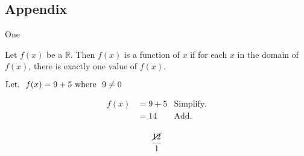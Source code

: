 \begin{appendix}
    \chapter{Appendix}
        One
        
    Let $f(x)$ be a $\mathbb{R}$. Then $f(x)$ is a function of $x$ if for each $x$ in the domain of $f(x)$, there is exactly one value of $f(x)$.
    
    \(\text{Let, \space}f(x)=9+5\text{\space where \space}9\neq 0\)
    
\begin{equation} 
    \begin{aligned}
        f(x) &= 9+5 & \text{Simplify.} \\
        &= 14 & \text{Add.} \\
    \end{aligned}
\end{equation}

\[\frac{\cancel{12}}{1}\]

\end{appendix}